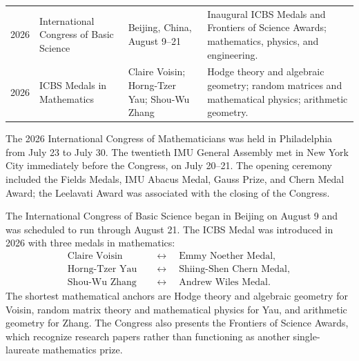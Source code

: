 {\begin{longtable}{@{}L{0.08\textwidth}L{0.25\textwidth}L{0.27\textwidth}L{0.32\textwidth}@{}}
        2026
        & International Congress of Basic Science
        & Beijing, China, August 9--21
        & Inaugural ICBS Medals and Frontiers of Science Awards; mathematics,
          physics, and engineering. \\

        2026
        & ICBS Medals in Mathematics
        & Claire Voisin; Horng-Tzer Yau; Shou-Wu Zhang
        & Hodge theory and algebraic geometry; random matrices and mathematical
          physics; arithmetic geometry. \\
    \end{longtable}
    }

    \begin{fact}[ICM 2026]
        The 2026 International Congress of Mathematicians was held in
        Philadelphia from July 23 to July 30. The twentieth IMU General Assembly
        met in New York City immediately before the Congress, on July 20--21.
        The opening ceremony included the Fields Medals, IMU Abacus Medal, Gauss
        Prize, and Chern Medal Award; the Leelavati Award was associated with the
        closing of the Congress.
    \end{fact}

    \begin{fact}
        The International Congress of Basic Science began in Beijing on August 9
        and was scheduled to run through August 21. The ICBS Medal was introduced
        in 2026 with three medals in mathematics:
        \[
            \begin{aligned}
                \text{Claire Voisin}
                &\quad\longleftrightarrow\quad
                \text{Emmy Noether Medal},\\
                \text{Horng-Tzer Yau}
                &\quad\longleftrightarrow\quad
                \text{Shiing-Shen Chern Medal},\\
                \text{Shou-Wu Zhang}
                &\quad\longleftrightarrow\quad
                \text{Andrew Wiles Medal}.
            \end{aligned}
        \]
        The shortest mathematical anchors are Hodge theory and algebraic
        geometry for Voisin, random matrix theory and mathematical physics for
        Yau, and arithmetic geometry for Zhang. The Congress also presents the
        Frontiers of Science Awards, which recognize research papers rather than
        functioning as another single-laureate mathematics prize.
    \end{fact}

